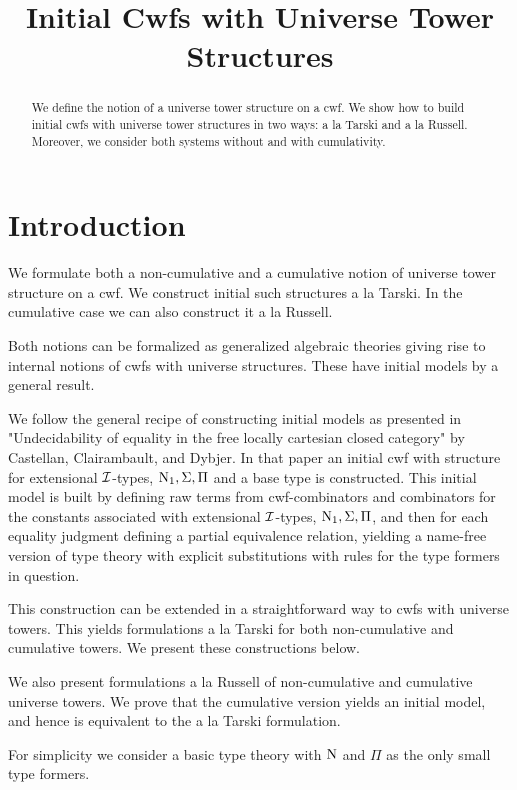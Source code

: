 \documentclass{lmcs}
\title[Initial Cwfs with Universe Tower Structures]{Initial Cwfs with Universe Tower Structures}
\begin{document}
\begin{abstract}
We define the notion of a universe tower structure on a cwf. We show how to build initial cwfs with universe tower structures in two ways: a la Tarski and a la Russell. Moreover, we consider both systems without and with cumulativity.
\end{abstract}

\maketitle

\section{Introduction}

We formulate both a non-cumulative and a cumulative notion of universe tower structure on a cwf. We construct initial such structures a la Tarski. In the cumulative case we can also construct it a la Russell. 

Both notions can be formalized as generalized algebraic theories giving rise to internal notions of cwfs with universe structures. These have initial models by a general result. 

We follow the general recipe of constructing initial models as presented in "Undecidability of equality in the free locally cartesian closed category" by Castellan, Clairambault, and Dybjer. In that paper an initial cwf with structure for extensional ${\mathcal I}$-types, $\mathrm{N}_1, \Sigma, \Pi$ and a base type is constructed. This initial model is built by defining raw terms from cwf-combinators and combinators for the constants associated with extensional ${\mathcal I}$-types, $\mathrm{N}_1, \Sigma, \Pi$, and then for each equality judgment defining a partial equivalence relation, yielding a name-free version of type theory with explicit substitutions with rules for the type formers in question.

This construction can be extended in a straightforward way to cwfs with universe towers. This yields formulations a la Tarski for both non-cumulative and cumulative towers. We present these constructions below.

We also present formulations a la Russell of non-cumulative and cumulative universe towers. We prove that the cumulative version yields an initial model, and hence is equivalent to the a la Tarski formulation. 

For simplicity we consider a basic type theory with $\mathrm{N}$ and $\Pi$ as the only small type formers. 
\end{document}
